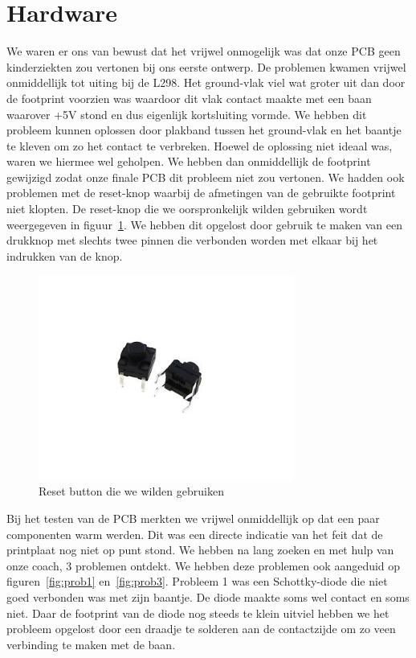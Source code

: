 \section{Hardware}
We waren er ons van bewust dat het vrijwel onmogelijk was dat onze PCB geen kinderziekten zou vertonen bij ons eerste ontwerp. De problemen kwamen vrijwel onmiddellijk tot uiting bij de L298. Het ground-vlak viel wat groter uit dan door de footprint voorzien was waardoor dit vlak contact maakte met een baan waarover +5V stond en dus eigenlijk kortsluiting vormde. We hebben dit probleem kunnen oplossen door plakband tussen het ground-vlak en het baantje te kleven om zo het contact te verbreken. Hoewel de oplossing niet ideaal was, waren we hiermee wel geholpen. We hebben dan onmiddellijk de footprint gewijzigd zodat onze finale PCB dit probleem niet zou vertonen. We hadden ook problemen met de reset-knop waarbij de afmetingen van de gebruikte footprint niet klopten. De reset-knop die we oorspronkelijk wilden gebruiken wordt weergegeven in figuur~\ref{fig:reset}. We hebben dit opgelost door gebruik te maken van een drukknop met slechts twee pinnen die verbonden worden met elkaar bij het indrukken van de knop. 
\begin{figure}[h]
\centering
\includegraphics[width=0.75\textwidth]{reset.jpg}
\caption{Reset button die we wilden gebruiken}
\label{fig:reset}
\end{figure}
Bij het testen van de PCB merkten we vrijwel onmiddellijk op dat een paar componenten warm werden. Dit was een directe indicatie van het feit dat de printplaat nog niet op punt stond. We hebben na lang zoeken en met hulp van onze coach, 3 problemen ontdekt. We hebben deze problemen ook aangeduid op figuren~\ref{fig:prob1} en~\ref{fig:prob3}.
Probleem 1 was een Schottky-diode die niet goed verbonden was met zijn baantje. De diode maakte soms wel contact en soms niet. Daar de footprint van de diode nog steeds te klein uitviel hebben we het probleem opgelost door een draadje te solderen aan de contactzijde om zo veen verbinding te maken met de baan.
